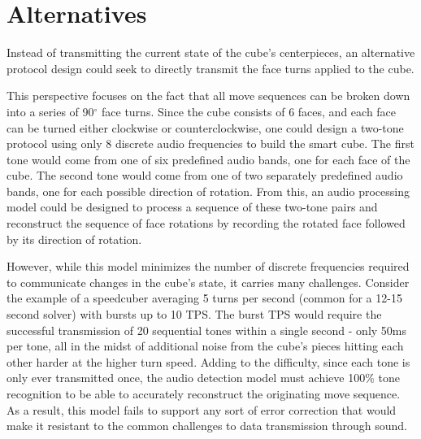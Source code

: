 \section{Alternatives}
\label{sec:alternatives}
Instead of transmitting the current state of the cube's centerpieces, an alternative protocol design could seek to directly transmit the face turns applied to the cube.

This perspective focuses on the fact that all move sequences can be broken down into a series of 90$^\circ$ face turns.
Since the cube consists of 6 faces, and each face can be turned either clockwise or counterclockwise, one could design a two-tone protocol using only 8 discrete audio frequencies to build the smart cube.
The first tone would come from one of six predefined audio bands, one for each face of the cube. 
The second tone would come from one of two separately predefined audio bands, one for each possible direction of rotation.
From this, an audio processing model could be designed to process a sequence of these two-tone pairs and reconstruct the sequence of face rotations by recording the rotated face followed by its direction of rotation.

However, while this model minimizes the number of discrete frequencies required to communicate changes in the cube's state, it carries many challenges.
Consider the example of a speedcuber averaging 5 turns per second (common for a 12-15 second solver) with bursts up to 10 TPS.
The burst TPS would require the successful transmission of 20 sequential tones within a single second - only 50ms per tone, all in the midst of additional noise from the cube's pieces hitting each other harder at the higher turn speed.
Adding to the difficulty, since each tone is only ever transmitted once, the audio detection model must achieve 100\% tone recognition to be able to accurately reconstruct the originating move sequence.
As a result, this model fails to support any sort of error correction that would make it resistant to the common challenges to data transmission through sound.
